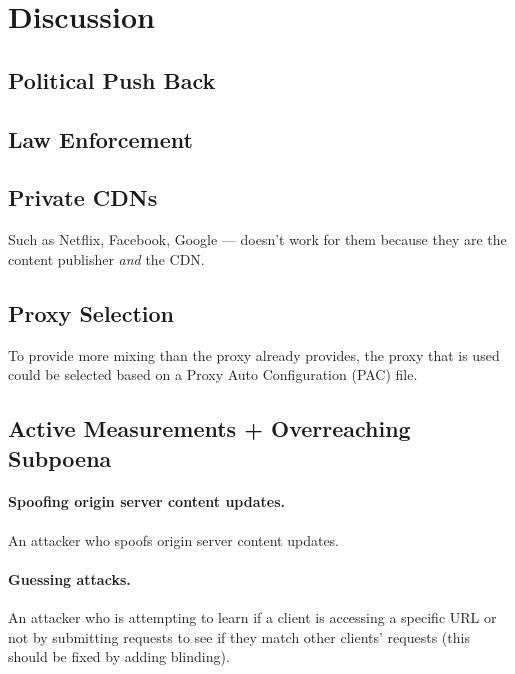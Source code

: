 \section{Discussion}
\label{sec:discussion}

\subsection{Political Push Back}

\subsection{Law Enforcement}

\subsection{Private CDNs}
Such as Netflix, Facebook, Google --- \system{} doesn't work for them because they are the content publisher {\it and} the CDN.

\subsection{Proxy Selection}
To provide more mixing than the proxy already provides, 
the proxy that is used could be selected based 
on a Proxy Auto Configuration (PAC) file.

\subsection{Active Measurements + Overreaching Subpoena}

\paragraph{Spoofing origin server content updates.}
An attacker who spoofs origin server content updates.

\paragraph{Guessing attacks.}
An attacker who is attempting to learn if a client is accessing a specific URL or not by submitting requests to see if they match other clients' requests (this should be fixed by adding blinding).
